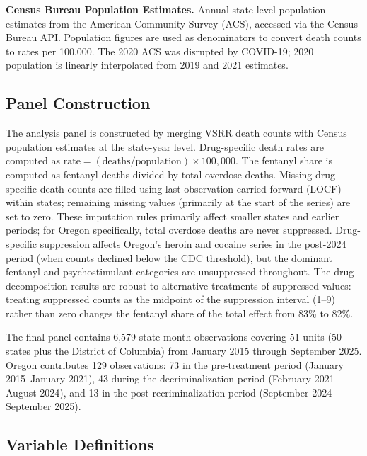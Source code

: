 \documentclass[12pt]{article}
\begin{document}
\textbf{Census Bureau Population Estimates.} Annual state-level population estimates from the American Community Survey (ACS), accessed via the Census Bureau API. Population figures are used as denominators to convert death counts to rates per 100,000. The 2020 ACS was disrupted by COVID-19; 2020 population is linearly interpolated from 2019 and 2021 estimates.

\subsection{Panel Construction}

The analysis panel is constructed by merging VSRR death counts with Census population estimates at the state-year level. Drug-specific death rates are computed as $\text{rate} = (\text{deaths} / \text{population}) \times 100{,}000$. The fentanyl share is computed as fentanyl deaths divided by total overdose deaths. Missing drug-specific death counts are filled using last-observation-carried-forward (LOCF) within states; remaining missing values (primarily at the start of the series) are set to zero. These imputation rules primarily affect smaller states and earlier periods; for Oregon specifically, total overdose deaths are never suppressed. Drug-specific suppression affects Oregon's heroin and cocaine series in the post-2024 period (when counts declined below the CDC threshold), but the dominant fentanyl and psychostimulant categories are unsuppressed throughout. The drug decomposition results are robust to alternative treatments of suppressed values: treating suppressed counts as the midpoint of the suppression interval (1--9) rather than zero changes the fentanyl share of the total effect from 83\% to 82\%.

The final panel contains 6,579 state-month observations covering 51 units (50 states plus the District of Columbia) from January 2015 through September 2025. Oregon contributes 129 observations: 73 in the pre-treatment period (January 2015--January 2021), 43 during the decriminalization period (February 2021--August 2024), and 13 in the post-recriminalization period (September 2024--September 2025).

\subsection{Variable Definitions}
\end{document}
